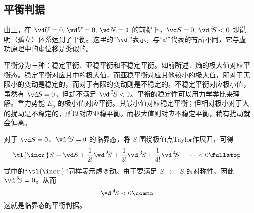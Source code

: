 	\subsection{平衡判据}
		\begin{myEnum1}
				由上，在 $\vd U = 0, \, \vd V = 0, \, \vd N = 0$ 的前提下，$\vd S = 0, \, \vd^{\:2} \! S <0$ 即说明（孤立）体系达到了平衡。这里的“$\vd\,$”表示，与“$\dd\,$”代表的有所不同，它与虚功原理中的虚位移是类似的。%
				
				平衡分为三种：稳定平衡、亚稳平衡和不稳定平衡。如前所述，熵的极大值对应平衡态。稳定平衡对应其中的极大值，而亚稳平衡对应其他较小的极大值，即对于无限小的变动是稳定的，而对于有限的变动则是不稳定的。不稳定平衡对应极小值，虽然有 $\vd S = 0$，但却不满足 $\vd^{\:2} \! S <0$。平衡的稳定性可以用力学类比来理解。重力势能 $E_\text{p}$ 的极小值对应平衡。其最小值对应稳定平衡；但相对极小对于大的扰动是不稳定的，所以对应亚稳平衡。而极大值则对应不稳定平衡，稍有扰动就会偏离。%
				
				对于 $\vd S = 0$、$\vd^{\:2} \! S =0$ 的临界态，将 $S$ 围绕极值点Taylor作展开，可得
				\begin{equation}
					\tl{\incr\,} S = \vd S + \frac{1}{2!} \vd^{\:2} \! S + \frac{1}{3!} \vd^{\:3} \! S + \frac{1}{4!} \vd^{\:4} \! S + \cdots < 0 \fullstop
				\end{equation}
				式中的“$\tl{\incr\,}$”同样表示虚变动。由于要满足 $S \rightarrow -S$ 的对称性，因此 $\vd^{\:3} \! S = 0$。从而%
				\begin{equation}
					\vd^{\:4} \! S < 0 \comma
				\end{equation}
				这就是临界态的平衡判据。
				

\end{myEnum1}
